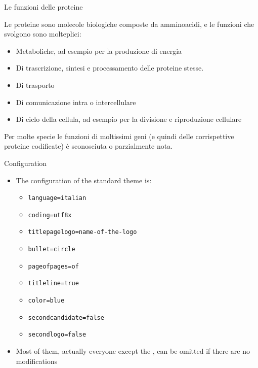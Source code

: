 \documentclass{beamer}
\begin{document}
\begin{tframe}{Le funzioni delle proteine}


      Le proteine sono molecole biologiche composte da amminoacidi, e le funzioni che svolgono sono molteplici:
	   \begin{itemize}	
	   \item Metaboliche, ad esempio per la produzione di energia
	   \onslide<3->
		\item Di trascrizione, sintesi e processamento delle proteine stesse.
		\onslide<4->		
		\item Di trasporto
		\onslide<5->
		\item Di comunicazione intra o intercellulare
		\onslide<6->
		\item Di ciclo della cellula, ad esempio per la divisione e riproduzione cellulare
      \end{itemize}
      Per molte specie le funzioni di moltissimi geni (e quindi delle corrispettive proteine codificate) è sconosciuta o parzialmente nota.

\end{tframe}


\begin{frame}[t,fragile]{Configuration}
\begin{itemize}
\item The configuration of the standard theme is:
\begin{itemize}
\item \verb!language=italian!
\item \verb!coding=utf8x!
\item \verb!titlepagelogo=name-of-the-logo!
\item \verb!bullet=circle!
\item \verb!pageofpages=of!
\item \verb!titleline=true!
\item \verb!color=blue!
\item \verb!secondcandidate=false!
\item \verb!secondlogo=false!
\end{itemize}
\item Most of them, actually everyone except the , can be omitted if there are no modifications
\end{itemize}
\end{frame}
\end{document}
